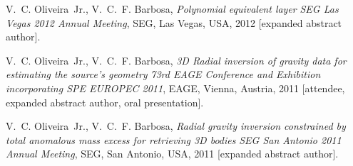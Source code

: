 \begin{thebibliography}{10}
	V.~C. Oliveira~Jr., V.~C.~F. Barbosa, \emph{Polynomial equivalent layer}
	\emph{SEG Las Vegas 2012 Annual Meeting}, SEG, Las Vegas, USA,
	2012 [expanded abstract author].
	
	V.~C. Oliveira~Jr., V.~C.~F. Barbosa, \emph{3D Radial inversion of gravity data
		for estimating the source's geometry} \emph{73rd EAGE Conference and
		Exhibition incorporating SPE EUROPEC 2011}, EAGE, Vienna, Austria, 2011 [attendee,
	expanded abstract author, oral presentation].
	
	V.~C. Oliveira~Jr., V.~C.~F. Barbosa, \emph{Radial gravity inversion
		constrained by total anomalous mass excess for retrieving 3D bodies} 
	\emph{SEG San Antonio 2011 Annual Meeting}, SEG, San Antonio, USA, 2011 [expanded
	abstract author].
	
\end{thebibliography}

